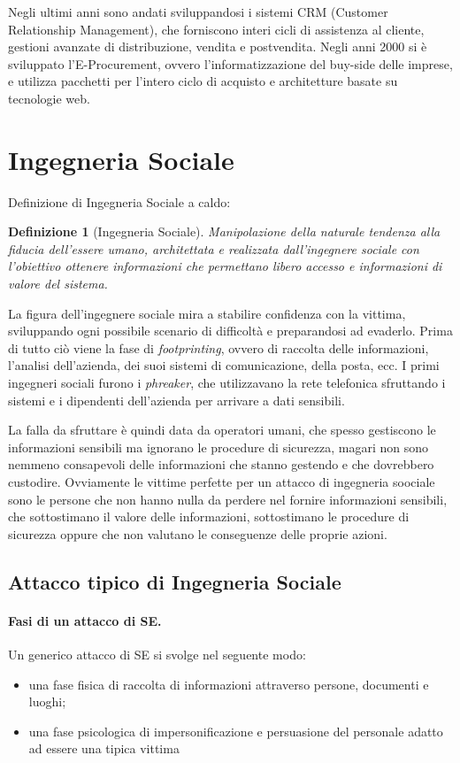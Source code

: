 \documentclass[a4paper, 10pt]{article}
\newtheorem{definit}{Definizione}[subsection]
\begin{document}
	Negli ultimi anni sono andati sviluppandosi i sistemi CRM (Customer Relationship Management), che forniscono interi cicli di assistenza al cliente, gestioni avanzate di distribuzione, vendita e postvendita. Negli anni 2000 si è sviluppato l'E-Procurement, ovvero l'informatizzazione del buy-side delle imprese, e utilizza pacchetti per l'intero ciclo di acquisto e architetture basate su tecnologie web.
	
	\section{Ingegneria Sociale}
	Definizione di Ingegneria Sociale a caldo:\begin{definit}[Ingegneria Sociale]
		Manipolazione della naturale tendenza alla fiducia dell’essere umano, architettata e realizzata dall’ingegnere sociale con l’obiettivo ottenere informazioni che permettano libero accesso e informazioni di valore del sistema.
	\end{definit}

	La figura dell'ingegnere sociale mira a stabilire confidenza con la vittima, sviluppando ogni possibile scenario di difficoltà e preparandosi ad evaderlo. Prima di tutto ciò viene la fase di \textit{footprinting}, ovvero di raccolta delle informazioni, l'analisi dell'azienda, dei suoi sistemi di comunicazione, della posta, ecc. I primi ingegneri sociali furono i \textit{phreaker}, che utilizzavano la rete telefonica sfruttando i sistemi e i dipendenti dell'azienda per arrivare a dati sensibili.
	
	La falla da sfruttare è quindi data da operatori umani, che spesso gestiscono le informazioni sensibili ma ignorano le procedure di sicurezza, magari non sono nemmeno consapevoli delle informazioni che stanno gestendo e che dovrebbero custodire. 
	Ovviamente le vittime perfette per un attacco di ingegneria soociale sono le persone che non hanno nulla da perdere nel fornire informazioni sensibili, che sottostimano il valore delle informazioni, sottostimano le procedure di sicurezza oppure che non valutano le conseguenze delle proprie azioni.
	
	\subsection{Attacco tipico di Ingegneria Sociale}
	\paragraph{Fasi di un attacco di SE.} Un generico attacco di SE si svolge nel seguente modo: \begin{itemize}
		\item una fase fisica di raccolta di informazioni attraverso persone, documenti e luoghi;
		\item una fase psicologica di impersonificazione e persuasione del personale adatto ad essere una tipica vittima
	\end{itemize}
\end{document}
